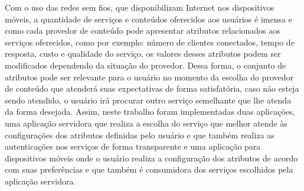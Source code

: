 \begin{resumo}
Com o uso das redes sem fios, que disponibilizam Internet nos dispositivos móveis, a quantidade de serviços e conteúdos oferecidos aos usuários é imensa e como cada provedor de conteúdo pode apresentar atributos relacionados aos serviços oferecidos, como por exemplo: número de clientes conectados, tempo de resposta, custo e qualidade do serviço, os valores desses atributos podem ser modificados dependendo da situação do provedor. Dessa forma, o conjunto de atributos pode ser relevante para o usuário no momento da escolha do provedor de conteúdo que atenderá suas expectativas de forma satisfatória, caso não esteja sendo atendido, o usuário irá procurar outro serviço semelhante que lhe atenda da forma desejada. Assim, neste trabalho foram implementadas duas aplicações, uma aplicação servidora que realiza a escolha do serviço que melhor atende às configurações dos atributos definidas pelo usuário e que também realiza as autenticações nos serviços de forma transparente e uma aplicação para dispositivos móveis onde o usuário realiza a configuração dos atributos de acordo com suas preferências e que também é consumidora dos serviços escolhidos pela aplicação servidora.
\end{resumo}	
